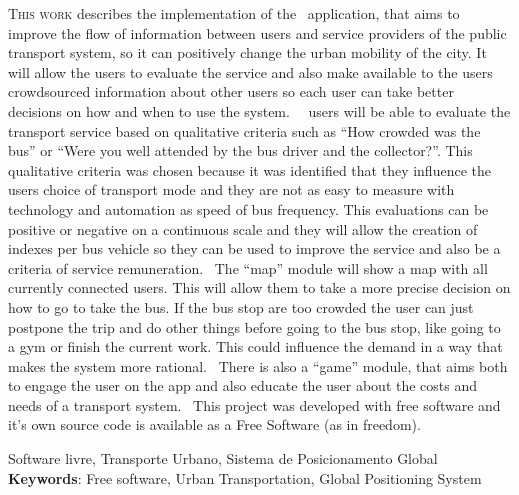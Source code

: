 \lettrine{T}{his work} describes the implementation of the \trilhasp~application, that aims to improve the flow of information between users and service providers of the public transport system, so it can positively change the urban mobility of the city. It will allow the users to evaluate the service and also make available to the users crowdsourced information about other users so each user can take better decisions on how and when to use the system.%
%
~\trilhasp~users will be able to evaluate the transport service based on qualitative criteria such as ``How crowded was the bus'' or ``Were you well attended by the bus driver and the collector?''. This qualitative criteria was chosen because it was identified that they influence the users choice of transport mode and they are not as easy to measure with technology and automation as speed of bus frequency. This evaluations can be positive or negative on a continuous scale and they will allow the creation of indexes per bus vehicle so they can be used to improve the service and also be a criteria of service remuneration.%
%
~The ``map'' module will show a map with all currently connected users. This will allow them to take a more precise decision on how to go to take the bus. If the bus stop are too crowded the user can just postpone the trip and do other things before going to the bus stop, like going to a gym or finish the current work. This could influence the demand in a way that makes the system more rational.%
%
~There is also a ``game'' module, that aims both to engage the user on the app and also educate the user about the costs and needs of a transport system.%
%
~This project was developed with free software and it's own source code is available as a Free Software (as in freedom).

\vspace{\onelineskip}

\vfill

\noindent

Software livre, Transporte Urbano, Sistema de Posicionamento Global
\textbf{Keywords}: Free software, Urban Transportation, Global Positioning System